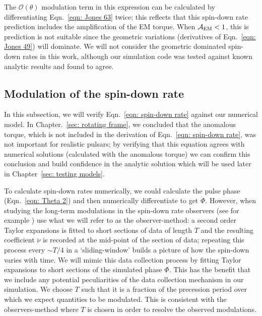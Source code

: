 \documentclass[../full_thesis/full_thesis.tex]{subfiles}
\begin{document}
The $\mathcal{O}(\theta)$ modulation term in this expression can be calculated
by differentiating Eqn.~\eqref{eqn: Jones 63} twice; this reflects that this
spin-down rate prediction includes the amplification of the EM torque. When
$\mathcal{A}_{\mathrm{EM}} < 1$, this is prediction is not suitable since the geometric variations
(derivatives of Eqn.~\eqref{eqn: Jones 49}) will dominate. We will not consider
the geometric dominated spin-down rates in this work, although our simulation
code was tested against known analytic results and found to agree.

\subsection{Modulation of the spin-down rate}
\label{sec: spin-down rate numerical}

In this subsection, we will verify Eqn.~\eqref{eqn: spin-down rate} against our
numerical model. In Chapter.~\ref{sec: rotating frame}, we concluded that the
anomalous torque, which is not included in the derivation of Eqn.~\eqref{eqn:
spin-down rate}, was not important for realistic pulsars; by verifying that
this equation agrees with numerical solutions (calculated with the anomalous
torque) we can confirm this conclusion and build confidence in the analytic
solution which will be used later in Chapter~\ref{sec: testing models}.

 To calculate spin-down rates numerically, we could calculate the pulse phase
(Eqn.~\eqref{eqn: Theta 2}) and then numerically differentiate to get
$\ddot{\Phi}$. However, when studying the long-term modulations in the spin-down
rate observers (see for example \citet{Lyne2010, Perera2015}) use what we will
refer to as the observer-method: a second order Taylor expansions is
fitted to short sections of data of length $T$ and the resulting coefficient
$\ddot{\nu}$ is recorded at the mid-point of the section of data; repeating
this process every $\sim T/4$ in a `sliding-window' builds a picture of how the
spin-down varies with time.  We will mimic this data collection process by
fitting Taylor expansions to short sections of the simulated phase $\Phi$. This
has the benefit that we include any potential peculiarities of the data
collection mechanism in our simulation.  We choose $T$ such that it is a
fraction of the precession period over which we expect quantities to be
modulated. This is consistent with the observers-method where $T$ is chosen in
order to resolve the observed modulations.
\end{document}
